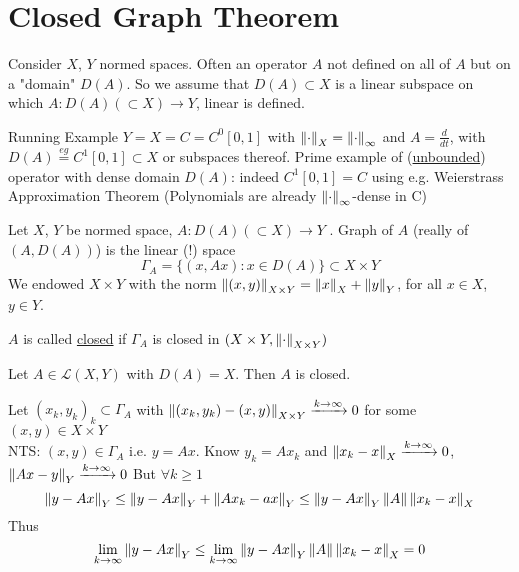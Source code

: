 \section{Closed Graph Theorem}
Consider $X$, $Y$ normed spaces. Often an operator $A$ not defined on all of $A$ but on a "domain" $D(A)$. So we assume that 
$D(A)\subset X$ is a linear subspace on which $A:D(A)(\subset X)\to Y$, linear is defined.
\begin{example}{Running Example}\nl
$Y=X=C=C^0[0,1]$ with $\left\|{\cdot}\right\|_X=\left\|{\cdot}\right\|_\infty$ and $A=\frac{d}{dt}$, with $D(A)\stackrel{eg}{=}C^1[0,1]\subset X$ or subspaces thereof. Prime example of  (\underline{unbounded}) operator with dense domain $D(A)$: indeed $C^1[0,1]=C$ using e.g. Weierstrass Approximation Theorem (Polynomials are already $\left\|{\cdot}\right\|_\infty$-dense in C)
\end{example}
\begin{definition}[Graph]\nl
Let $X$, $Y$ be normed space, $A:D(A)(\subset X)\to Y$ . Graph of $A$ (really  of $(A,D(A))$) is the linear (!) space 
$$
\Gamma_A=\{(x,Ax):x\in D(A)\}\subset X\times Y
$$
We endowed $X\times Y$ with the norm $\left\|{(x,y)}\right\|_{X\times Y}=\left\|{x}\right\|_X+\left\|{y}\right\|_Y$, for all $x\in X$, $y\in Y$.
    
\end{definition}
\begin{definition}\label{Closed Operator}
$A$ is called \underline{closed} if $\Gamma_A$ is closed in  $(X\times Y,\left\|{\cdot}\right\|_{X\times Y})$
\end{definition}

\begin{example}
Let $A\in\mathcal{L}(X,Y)$ with $D(A)=X$. Then $A$ is closed.
\begin{pf}{}{}
	Let $(x_k,y_k)_k\subset \Gamma_A$  with $\left\|{(x_k,y_k)-(x,y)}\right\|_{X\times Y}\xrightarrow{k\to\infty}0$ for some $(x,y)\in X\times Y$\\
	NTS: $(x,y)\in \Gamma_A$ i.e. $y=Ax$. 
	Know $ y_k=Ax_k$ and $\left\|{x_k-x}\right\|_X\xrightarrow{k\to\infty}0$, $\left\|{Ax-y}\right\|_Y\xrightarrow{k\to\infty}0$
	But $\forall k\geq 1$
	$$\left\|{y-Ax}\right\|_Y\leq\left\|{y-Ax}\right\|_Y+\left\|{Ax_k-ax}\right\|_Y
	\leq \left\|{y-Ax}\right\|_Y\left\|{A}\right\|\left\|{x_k-x}\right\|_X$$
	Thus 
	$$\lim_{k\to\infty}\left\|{y-Ax}\right\|_Y\leq\lim_{k\to\infty}\left\|{y-Ax}\right\|_Y\left\|{A}\right\|\left\|{x_k-x}\right\|_X=0$$
\end{pf}
\end{example}

